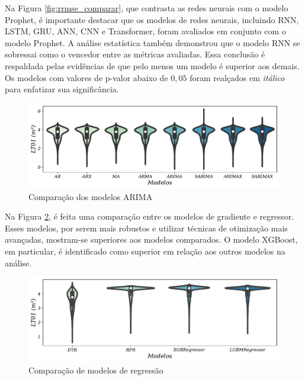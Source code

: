 Na Figura \ref{fig:rrmse_comparar}, que contrasta as redes neurais com o modelo Prophet, é importante destacar que os modelos de redes neurais, incluindo RNN, LSTM, GRU, ANN, CNN e Transformer, foram avaliados em conjunto com o modelo Prophet. A análise estatística também demonstrou que o modelo RNN se sobressai como o vencedor entre as métricas avaliadas. Essa conclusão é respaldada pelas evidências de que pelo menos um modelo é superior aos demais. Os modelos com valores de p-valor abaixo de $0,05$ foram realçados em \textit{itálico} para enfatizar sua significância.

\begin{figure}[!htb]
	\centering
	\caption{Comparação dos modelos ARIMA}\label{fig:modelos-arima}
	\includegraphics[width=\linewidth]{Resultados/Figuras/modelos-arima}
	
	
\end{figure}

Na Figura \ref{fig:violin-lr-xgb-lgbm-rf}, é feita uma comparação entre os modelos de gradiente e regressor. Esses modelos, por serem mais robustos e utilizar técnicas de otimização mais avançadas, mostram-se superiores aos modelos comparados. O modelo XGBoost, em particular, é identificado como superior em relação aos outros modelos na análise.

\begin{figure}[!htb]
	\centering
	\caption{Comparação de modelos de regressão}\label{fig:violin-lr-xgb-lgbm-rf}
	\includegraphics[width=\linewidth]{Resultados/Figuras/violin-LR-XGB-LGBM-RF}
	
\end{figure}

